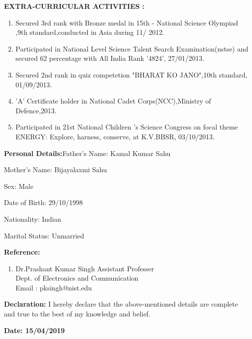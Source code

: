 \documentclass[a4]{article}
\begin{document}
\vspace{3mm}
\textbf{EXTRA-CURRICULAR ACTIVITIES : } 
\begin{enumerate}
	\item Secured 3rd rank with Bronze medal in 15th - National Science Olympiad ,9th standard,conducted in Asia during 11/ 2012.
        \item Participated in National Level Science Talent Search Examination(nstse) and secured 62 percentage with All India Rank '4824', 27/01/2013.
	\item Secured 2nd rank in quiz competetion "BHARAT KO JANO",10th standard, 01/09/2013.
        \item 'A' Certificate holder in National Cadet Corps(NCC),Ministry of Defence,2013.
        \item Participated in 21st National Children 's Science Congress on focal theme ENERGY: Explore, harness, conserve, at K.V.BBSR, 03/10/2013.
        
\end{enumerate}

\vspace{3mm}
\textbf{Personal Details:}\hspace{.4cm}Father's Name: Kamal Kumar Sahu

\hspace{3.4cm}Mother's Name: Bijayalaxmi Sahu

\hspace{3.4cm}Sex: Male

\hspace{3.4cm}Date of Birth: 29/10/1998

\hspace{3.4cm}Nationality: Indian

\hspace{3.4cm}Marital Status: Unmarried

\vspace{3mm}
\textbf{Reference: }
\begin{enumerate}
\item Dr.Prashant Kumar Singh
Assistant Professer \\
Dept. of Electronics and Communication \\ 
Email : pksingh@nist.edu \\


\end{enumerate}

\vspace{3mm}
\textbf{Declaration: }I hereby declare that the above-mentioned details are complete and true to the best of my knowledge and belief.

\vspace{3mm}
\textbf{Date: 15/04/2019}
\end{document}

